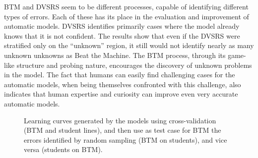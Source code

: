 BTM and DVSRS seem to be different processes, capable of identifying different types of errors. Each of these has its place in the evaluation and improvement of automatic models. DVSRS identifies primarily cases where the model already knows that it is not confident. 
The results show that even if the DVSRS were stratified only on the ``unknown'' region, it still would not identify nearly as many unknown unknowns as Beat the Machine.
The BTM process, through its game-like structure and probing nature, encourages the discovery of unknown problems in the model. The fact that humans can easily find challenging cases for the automatic models, when being themselves confronted with this challenge, also indicates that human expertise and curiosity can improve even very accurate automatic models.



\begin{figure}[t]
\caption{Learning curves generated by the models
using cross-validation (BTM and student lines), and then use as test case for BTM the errors identified by random sampling (BTM on students), and vice versa (students on BTM).}
\label{fig:curves}
\end{figure}


